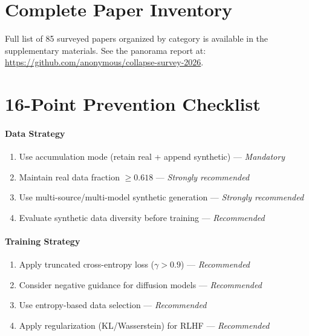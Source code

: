 \documentclass[11pt]{article}
\begin{document}
\appendix

\section{Complete Paper Inventory}
\label{sec:inventory}

Full list of 85 surveyed papers organized by category is available in the supplementary materials. See the panorama report at: \url{https://github.com/anonymous/collapse-survey-2026}.

\section{16-Point Prevention Checklist}
\label{sec:checklist}

\paragraph{Data Strategy}
\begin{enumerate}[label=C\arabic*]
    \item Use accumulation mode (retain real + append synthetic) --- \textit{Mandatory}
    \item Maintain real data fraction $\geq 0.618$ --- \textit{Strongly recommended}
    \item Use multi-source/multi-model synthetic generation --- \textit{Strongly recommended}
    \item Evaluate synthetic data diversity before training --- \textit{Recommended}
\end{enumerate}

\paragraph{Training Strategy}
\begin{enumerate}[label=C\arabic*, start=5]
    \item Apply truncated cross-entropy loss ($\gamma > 0.9$) --- \textit{Recommended}
    \item Consider negative guidance for diffusion models --- \textit{Recommended}
    \item Use entropy-based data selection --- \textit{Recommended}
    \item Apply regularization (KL/Wasserstein) for RLHF --- \textit{Recommended}
\end{enumerate}
\end{document}
